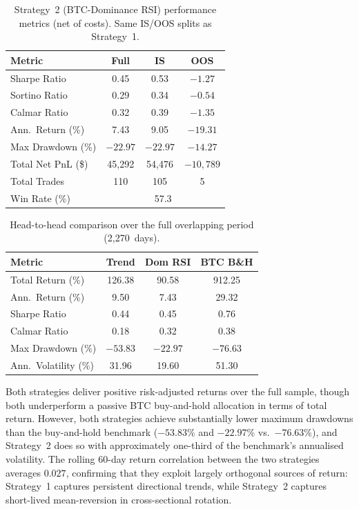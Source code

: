 \documentclass[11pt,a4paper]{article}
\begin{document}
\begin{table}[H]
  \centering
  \caption{Strategy~2 (BTC-Dominance RSI) performance metrics (net of costs).  Same IS/OOS splits as Strategy~1.}
  \label{tab:perf-s2}
  \begin{tabular}{lccc}
    \toprule
    Metric & Full & IS & OOS \\
    \midrule
    Sharpe Ratio            & 0.45  & 0.53  & $-1.27$  \\
    Sortino Ratio           & 0.29  & 0.34  & $-0.54$  \\
    Calmar Ratio            & 0.32  & 0.39  & $-1.35$  \\
    Ann.\ Return (\%)       & 7.43  & 9.05  & $-19.31$ \\
    Max Drawdown (\%)       & $-22.97$ & $-22.97$ & $-14.27$ \\
    Total Net PnL (\$)      & 45{,}292 & 54{,}476 & $-10{,}789$ \\
    Total Trades            & 110   & 105   & 5     \\
    Win Rate (\%)           & \multicolumn{3}{c}{57.3}  \\
    \bottomrule
  \end{tabular}
\end{table}

\begin{table}[H]
  \centering
  \caption{Head-to-head comparison over the full overlapping period (2{,}270~days).}
  \label{tab:comparison}
  \begin{tabular}{lccc}
    \toprule
    Metric & Trend & Dom RSI & BTC B\&H \\
    \midrule
    Total Return (\%)      & 126.38  & 90.58   & 912.25 \\
    Ann.\ Return (\%)      & 9.50    & 7.43    & 29.32  \\
    Sharpe Ratio           & 0.44    & 0.45    & 0.76   \\
    Calmar Ratio           & 0.18    & 0.32    & 0.38   \\
    Max Drawdown (\%)      & $-53.83$ & $-22.97$ & $-76.63$ \\
    Ann.\ Volatility (\%)  & 31.96   & 19.60   & 51.30  \\
    \bottomrule
  \end{tabular}
\end{table}

Both strategies deliver positive risk-adjusted returns over the full sample, though both underperform a passive BTC buy-and-hold allocation in terms of total return.  However, both strategies achieve substantially lower maximum drawdowns than the buy-and-hold benchmark ($-53.83\%$ and $-22.97\%$ vs.\ $-76.63\%$), and Strategy~2 does so with approximately one-third of the benchmark's annualised volatility.  The rolling 60-day return correlation between the two strategies averages $0.027$, confirming that they exploit largely orthogonal sources of return: Strategy~1 captures persistent directional trends, while Strategy~2 captures short-lived mean-reversion in cross-sectional rotation.
\end{document}
